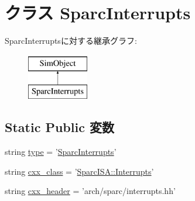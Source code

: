 \hypertarget{classSparcInterrupts_1_1SparcInterrupts}{
\section{クラス SparcInterrupts}
\label{classSparcInterrupts_1_1SparcInterrupts}
}
SparcInterruptsに対する継承グラフ:\begin{figure}[H]
\begin{center}
\leavevmode
\includegraphics[height=2cm]{classSparcInterrupts_1_1SparcInterrupts}
\end{center}
\end{figure}
\subsection*{Static Public 変数}
\begin{DoxyCompactItemize}
\item 
string \hyperlink{classSparcInterrupts_1_1SparcInterrupts_acce15679d830831b0bbe8ebc2a60b2ca}{type} = '\hyperlink{classSparcInterrupts_1_1SparcInterrupts}{SparcInterrupts}'
\item 
string \hyperlink{classSparcInterrupts_1_1SparcInterrupts_a58cd55cd4023648e138237cfc0822ae3}{cxx\_\-class} = '\hyperlink{classSparcISA_1_1Interrupts}{SparcISA::Interrupts}'
\item 
string \hyperlink{classSparcInterrupts_1_1SparcInterrupts_a17da7064bc5c518791f0c891eff05fda}{cxx\_\-header} = 'arch/sparc/interrupts.hh'
\end{DoxyCompactItemize}


